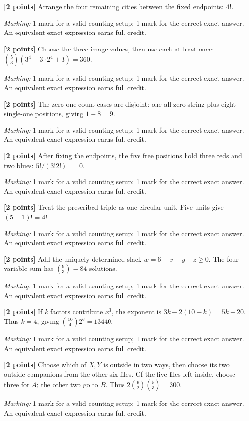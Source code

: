 \documentclass[12pt,letterpaper]{article}
\begin{document}
\begin{description}[font=\normalfont,leftmargin=1.2em,labelsep=0.4em]
\item[(a)] \textbf{[2 points]} Arrange the four remaining cities between the fixed endpoints: $4!$.
\par\textit{Marking:} 1 mark for a valid counting setup; 1 mark for the correct exact answer. An equivalent exact expression earns full credit.
\item[(b)] \textbf{[2 points]} Choose the three image values, then use each at least once: $\binom53(3^4-3\cdot2^4+3)=360$.
\par\textit{Marking:} 1 mark for a valid counting setup; 1 mark for the correct exact answer. An equivalent exact expression earns full credit.
\item[(c)] \textbf{[2 points]} The zero-one-count cases are disjoint: one all-zero string plus eight single-one positions, giving $1+8=9$.
\par\textit{Marking:} 1 mark for a valid counting setup; 1 mark for the correct exact answer. An equivalent exact expression earns full credit.
\item[(d)] \textbf{[2 points]} After fixing the endpoints, the five free positions hold three reds and two blues: $5!/(3!2!)=10$.
\par\textit{Marking:} 1 mark for a valid counting setup; 1 mark for the correct exact answer. An equivalent exact expression earns full credit.
\item[(e)] \textbf{[2 points]} Treat the prescribed triple as one circular unit. Five units give $(5-1)!=4!$.
\par\textit{Marking:} 1 mark for a valid counting setup; 1 mark for the correct exact answer. An equivalent exact expression earns full credit.
\item[(f)] \textbf{[2 points]} Add the uniquely determined slack $w=6-x-y-z\ge0$. The four-variable sum has $\binom93=84$ solutions.
\par\textit{Marking:} 1 mark for a valid counting setup; 1 mark for the correct exact answer. An equivalent exact expression earns full credit.
\item[(g)] \textbf{[2 points]} If $k$ factors contribute $x^3$, the exponent is $3k-2(10-k)=5k-20$. Thus $k=4$, giving $\binom{10}{4}2^6=13440$.
\par\textit{Marking:} 1 mark for a valid counting setup; 1 mark for the correct exact answer. An equivalent exact expression earns full credit.
\item[(h)] \textbf{[2 points]} Choose which of $X,Y$ is outside in two ways, then choose its two outside companions from the other six files. Of the five files left inside, choose three for $A$; the other two go to $B$. Thus $2\binom62\binom53=300$.
\par\textit{Marking:} 1 mark for a valid counting setup; 1 mark for the correct exact answer. An equivalent exact expression earns full credit.
\end{description}
\end{document}
